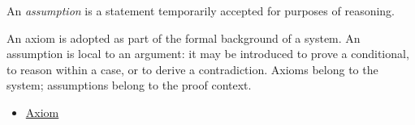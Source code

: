 \begin{definition}[Assumption]
\label{def:assumption}
An \emph{assumption} is a statement temporarily accepted for purposes of
reasoning.
\end{definition}

\begin{remark*}[Interpretation]
An axiom is adopted as part of the formal background of a system. An
assumption is local to an argument: it may be introduced to prove a conditional,
to reason within a case, or to derive a contradiction. Axioms belong to the
system; assumptions belong to the proof context.
\end{remark*}

\begin{dependencies}
\begin{itemize}
  \item \hyperref[def:axiom]{Axiom}
\end{itemize}
\end{dependencies}
